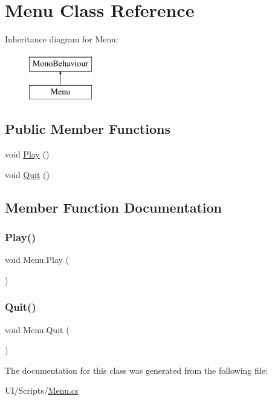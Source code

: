 \hypertarget{class_menu}{}\section{Menu Class Reference}
\label{class_menu}
Inheritance diagram for Menu\+:\begin{figure}[H]
\begin{center}
\leavevmode
\includegraphics[height=2.000000cm]{class_menu}
\end{center}
\end{figure}
\subsection*{Public Member Functions}
\begin{DoxyCompactItemize}
\item 
void \mbox{\hyperlink{class_menu_a646b54b7dc89c37f1149147fe151e4a4}{Play}} ()
\item 
void \mbox{\hyperlink{class_menu_a78c1f7e0f528e1690c0dc14ae483a4fe}{Quit}} ()
\end{DoxyCompactItemize}


\subsection{Member Function Documentation}
\mbox{\label{class_menu_a646b54b7dc89c37f1149147fe151e4a4}} 
\subsubsection{\texorpdfstring{Play()}{Play()}}
{\footnotesize\ttfamily void Menu.\+Play (\begin{DoxyParamCaption}{ }\end{DoxyParamCaption})}

\mbox{\label{class_menu_a78c1f7e0f528e1690c0dc14ae483a4fe}} 
\subsubsection{\texorpdfstring{Quit()}{Quit()}}
{\footnotesize\ttfamily void Menu.\+Quit (\begin{DoxyParamCaption}{ }\end{DoxyParamCaption})}



The documentation for this class was generated from the following file\+:\begin{DoxyCompactItemize}
\item 
U\+I/\+Scripts/\mbox{\hyperlink{_menu_8cs}{Menu.\+cs}}\end{DoxyCompactItemize}
